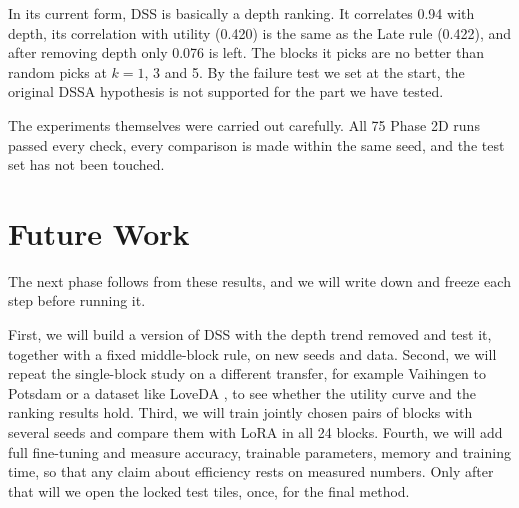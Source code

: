\documentclass[11pt,a4paper]{report}
\begin{document}
In its current form, DSS is basically a depth ranking. It correlates 0.94 with depth, its correlation with utility (0.420) is the same as the Late rule (0.422), and after removing depth only 0.076 is left. The blocks it picks are no better than random picks at $k = 1$, 3 and 5. By the failure test we set at the start, the original DSSA hypothesis is not supported for the part we have tested.

The experiments themselves were carried out carefully. All 75 Phase 2D runs passed every check, every comparison is made within the same seed, and the test set has not been touched.

\section{Future Work}

The next phase follows from these results, and we will write down and freeze each step before running it.

First, we will build a version of DSS with the depth trend removed and test it, together with a fixed middle-block rule, on new seeds and data. Second, we will repeat the single-block study on a different transfer, for example Vaihingen to Potsdam or a dataset like LoveDA \cite{wang2021loveda}, to see whether the utility curve and the ranking results hold. Third, we will train jointly chosen pairs of blocks with several seeds and compare them with LoRA in all 24 blocks. Fourth, we will add full fine-tuning and measure accuracy, trainable parameters, memory and training time, so that any claim about efficiency rests on measured numbers. Only after that will we open the locked test tiles, once, for the final method.
\end{document}
